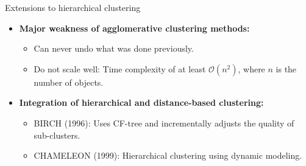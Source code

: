 \documentclass[aspectratio=169,t,xcolor=dvipsnames]{beamer}
\begin{document}
  { %
    \begin{frame}{Extensions to hierarchical clustering}
      \begin{itemize}
        \item \textbf{Major weakness of agglomerative clustering methods:}
        \begin{itemize}
          \item Can never undo what was done previously.
          \item Do not scale well: Time complexity of at least $\mathcal{O}(n^2)$, where $n$ is the number of objects.
        \end{itemize}
        \item \textbf{Integration of hierarchical and distance-based clustering:}
        \begin{itemize}
          \item BIRCH (1996): Uses CF-tree and incrementally adjusts the quality of sub-clusters.
          \item CHAMELEON (1999): Hierarchical clustering using dynamic modeling.
        \end{itemize}
      \end{itemize}
    \end{frame}
  }
\end{document}
